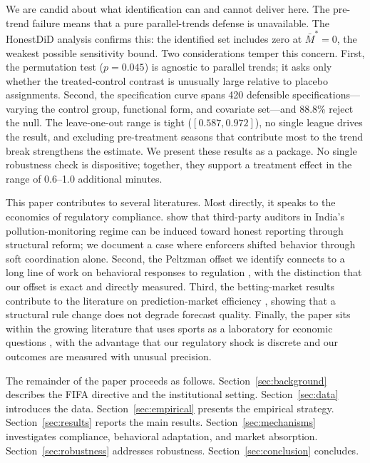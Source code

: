 We are candid about what identification can and cannot deliver here.
The pre-trend failure means that a pure parallel-trends defense is
unavailable.
The \citet{RambachanRoth2023} HonestDiD analysis confirms this:
the identified set includes zero at $\bar{M}^{*}=0$, the weakest
possible sensitivity bound.
Two considerations temper this concern.
First, the permutation test ($p=0.045$) is agnostic to parallel
trends; it asks only whether the treated-control contrast is unusually
large relative to placebo assignments.
Second, the specification curve spans 420 defensible specifications---varying
the control group, functional form, and covariate set---and 88.8\%
reject the null.
The leave-one-out range is tight ($[0.587, 0.972]$), no single
league drives the result, and excluding pre-treatment seasons that
contribute most to the trend break strengthens the estimate.
We present these results as a package. No single robustness check
is dispositive; together, they support a treatment effect in the
range of 0.6--1.0 additional minutes.

This paper contributes to several literatures.
Most directly, it speaks to the economics of regulatory compliance.
\citet{DufloGreenstoneHanna2013} show that third-party auditors
in India's pollution-monitoring regime can be induced toward honest
reporting through structural reform; we document a case where
enforcers shifted behavior through soft coordination alone.
Second, the Peltzman offset we identify connects to a long line of
work on behavioral responses to regulation
\citep{Peltzman1975,BlomquistPeltzman1986,CohenEinaav2003},
with the distinction that our offset is exact and directly measured.
Third, the betting-market results contribute to the literature on
prediction-market efficiency
\citep{Thaler1988,SnowbergWolfers2010,BordaloGennaioli2019},
showing that a structural rule change does not degrade forecast
quality.
Finally, the paper sits within the growing literature that uses
sports as a laboratory for economic questions
\citep{ChiapporiGrosecloseLevitt2002,RomerBR2006,GarrechtGaricano2006},
with the advantage that our regulatory shock is discrete and our
outcomes are measured with unusual precision.

The remainder of the paper proceeds as follows.
Section~\ref{sec:background} describes the FIFA directive and the
institutional setting.
Section~\ref{sec:data} introduces the data.
Section~\ref{sec:empirical} presents the empirical strategy.
Section~\ref{sec:results} reports the main results.
Section~\ref{sec:mechanisms} investigates compliance, behavioral
adaptation, and market absorption.
Section~\ref{sec:robustness} addresses robustness.
Section~\ref{sec:conclusion} concludes.
